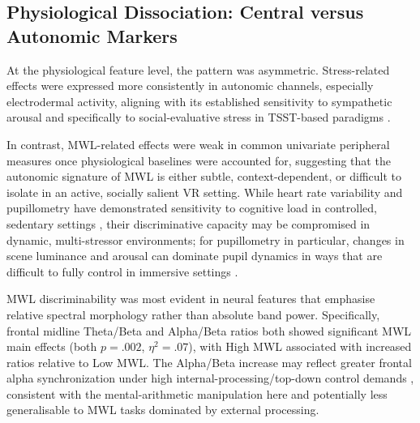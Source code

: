 \documentclass[lettersize,journal]{IEEEtran}
\begin{document}
\subsection{Physiological Dissociation: Central versus Autonomic Markers}
At the physiological feature level, the pattern was asymmetric. Stress-related effects were expressed more consistently in autonomic channels, especially electrodermal activity, aligning with its established sensitivity to sympathetic arousal \cite{faircloughFundamentalsPhysiologicalComputing2009, masiStressWorkloadAssessment2023} and specifically to social-evaluative stress in TSST-based paradigms \cite{alonsoStressAssessmentBased2015, goodmanMetaanalyticalAssessmentEffects2017}. 

In contrast, MWL-related effects were weak in common univariate peripheral measures once physiological baselines were accounted for, suggesting that the autonomic signature of MWL is either subtle, context-dependent, or difficult to isolate in an active, socially salient VR setting. While heart rate variability and pupillometry have demonstrated sensitivity to cognitive load in controlled, sedentary settings \cite{hughesCardiacMeasuresCognitiveWorkload2019, vanderwelPupilDilationIndex2018, piquadoPupillometryMeasureCognitive2010, mathotPupillometryPsychologyPhysiology2017}, their discriminative capacity may be compromised in dynamic, multi-stressor environments; for pupillometry in particular, changes in scene luminance and arousal can dominate pupil dynamics in ways that are difficult to fully control in immersive settings \cite{panEmotionalArousalPupilLuminance2024, mathotPupillometryPsychologyPhysiology2017}.

MWL discriminability was most evident in neural features that emphasise relative spectral morphology rather than absolute band power. Specifically, frontal midline Theta/Beta and Alpha/Beta ratios both showed significant MWL main effects (both $p=.002$, $\eta^2=.07$), with High MWL associated with increased ratios relative to Low MWL. The Alpha/Beta increase may reflect greater frontal alpha synchronization under high internal-processing/top-down control demands \cite{benedekEEGAlphaSynchronization2011}, consistent with the mental-arithmetic manipulation here and potentially less generalisable to MWL tasks dominated by external processing.
\end{document}
